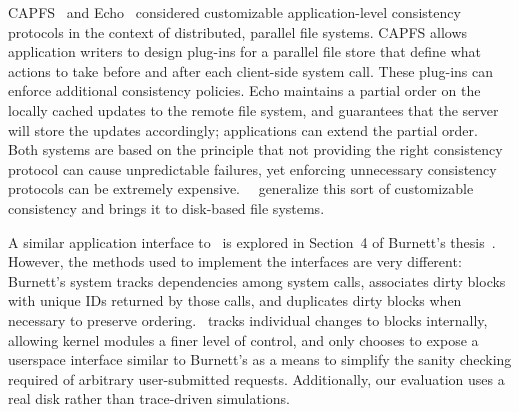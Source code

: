 CAPFS~\cite{vilayannur05providing} and Echo~\cite{mann94coherent}
considered
customizable application-level consistency protocols
in the context of distributed, parallel file systems.
%
CAPFS allows application writers to design plug-ins for a parallel file store
that define what actions to take before and after each client-side system
call.
%
These plug-ins can enforce additional consistency policies.
%
Echo maintains a partial order on the locally cached updates to the remote file
system, and guarantees that the server will store the updates accordingly;
applications can extend the partial order.
%
Both systems are based on the principle that not providing the right
consistency protocol can cause unpredictable failures, yet enforcing
unnecessary consistency protocols can be extremely expensive.
%
%
\Kudos\ \patchgroups\ generalize this sort of customizable consistency
and brings it to disk-based file systems.

A similar application interface to \patchgroups\ is explored in
Section~4 of Burnett's thesis~\cite{burnett06information}. However, the methods
used to implement the interfaces are very different: Burnett's system tracks
dependencies among system calls, associates dirty blocks with
unique IDs returned by those calls, and duplicates dirty blocks when necessary
to preserve ordering. \Kudos\ tracks individual changes to blocks internally,
allowing kernel modules a finer level of control, and only chooses to expose a
userspace interface similar to Burnett's as a means to simplify the sanity
checking required of arbitrary user-submitted requests.
%
Additionally, our evaluation uses a real disk rather than trace-driven
simulations.

